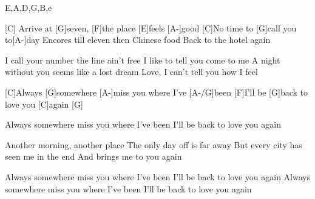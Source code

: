 
\begin{tabline}{5}{}{}{E,A,D,G,B,e}



\nextbar
{}

\nextbar
{}

\nextbar
{}

\nextbar
{}

\end{tabline}

\begin{guitar}


[C] Arrive at [G]seven, [F]the place [E]feels [A-]good
[C]No time to [G]call you to[A-]day
Encores till eleven then Chinese food
Back to the hotel again

I call your number the line ain't free
I like to tell you come to me
A night without you seems like a lost dream
Love, I can't tell you how I feel

[C]Always [G]somewhere [A-]miss you where I've [A-/G]been
[F]I'll be [G]back to love you [C]again [G]

Always somewhere miss you where I've been
I'll be back to love you again

Another morning, another place
The only day off is far away
But every city has seen me in the end
And brings me to you again

Always somewhere miss you where I've been
I'll be back to love you again
Always somewhere miss you where I've been
I'll be back to love you again
\end{guitar}